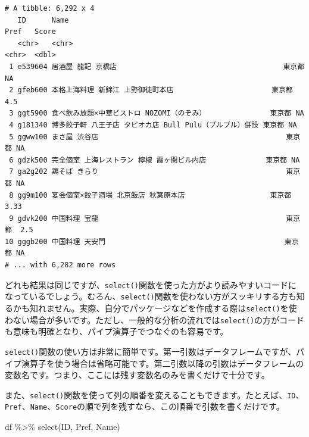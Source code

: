 \documentclass[
  a4paper,
  pandoc,
  ja=standard,
  jafont=haranoaji]{bxjsbook}
\newenvironment{Shaded}{\begin{snugshade}}{\end{snugshade}}
\newcommand{\FunctionTok}[1]{\textcolor[rgb]{0.28,0.35,0.67}{#1}}
\newcommand{\NormalTok}[1]{\textcolor[rgb]{0.00,0.48,0.65}{#1}}
\newcommand{\SpecialCharTok}[1]{\textcolor[rgb]{0.37,0.37,0.37}{#1}}
\begin{document}
\begin{verbatim}
# A tibble: 6,292 x 4
   ID      Name                                                     Pref   Score
   <chr>   <chr>                                                    <chr>  <dbl>
 1 e539604 居酒屋 龍記 京橋店                                       東京都 NA   
 2 gfeb600 本格上海料理 新錦江 上野御徒町本店                       東京都  4.5 
 3 ggt5900 食べ飲み放題×中華ビストロ NOZOMI（のぞみ）               東京都 NA   
 4 g181340 博多餃子軒 八王子店 タピオカ店 Bull Pulu（ブルプル）併設 東京都 NA   
 5 ggww100 まさ屋 渋谷店                                            東京都 NA   
 6 gdzk500 完全個室 上海レストラン 檸檬 霞ヶ関ビル内店              東京都 NA   
 7 ga2g202 鶏そば きらり                                            東京都 NA   
 8 gg9m100 宴会個室×餃子酒場 北京飯店 秋葉原本店                    東京都  3.33
 9 gdvk200 中国料理 宝龍                                            東京都  2.5 
10 gggb200 中国料理 天安門                                          東京都 NA   
# ... with 6,282 more rows
\end{verbatim}

どれも結果は同じですが、\texttt{select()}関数を使った方がより読みやすいコードになっているでしょう。むろん、\texttt{select()}関数を使わない方がスッキリする方も知るかも知れません。実際、自分でパッケージなどを作成する際は\texttt{select()}を使わない場合が多いです。ただし、一般的な分析の流れでは\texttt{select()}の方がコードも意味も明確となり、パイプ演算子でつなぐのも容易です。

\texttt{select()}関数の使い方は非常に簡単です。第一引数はデータフレームですが、パイプ演算子を使う場合は省略可能です。第二引数以降の引数はデータフレームの変数名です。つまり、ここには残す変数名のみを書くだけで十分です。

また、\texttt{select()}関数を使って列の順番を変えることもできます。たとえば、\texttt{ID}、\texttt{Pref}、\texttt{Name}、\texttt{Score}の順で列を残すなら、この順番で引数を書くだけです。

\begin{Shaded}
\begin{Highlighting}[numbers=left,,]
\NormalTok{df }\SpecialCharTok{\%\textgreater{}\%}
  \FunctionTok{select}\NormalTok{(ID, Pref, Name)}
\end{Highlighting}
\end{Shaded}
\end{document}
